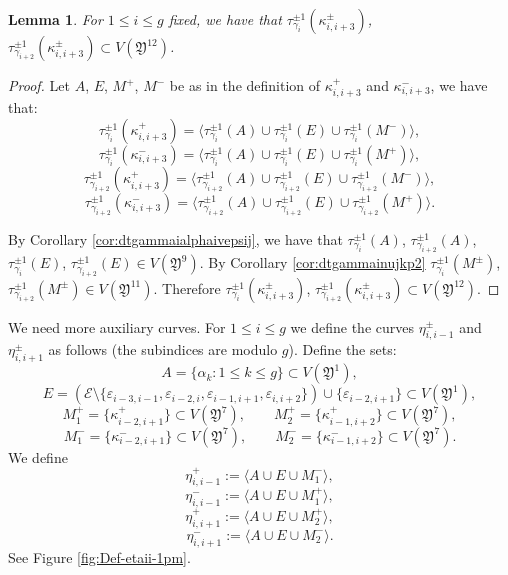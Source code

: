 \documentclass{artv3}
\newtheorem{lemma}[theorem]{Lemma}
\newcommand*{\veps}{\varepsilon}
\newcommand*{\dt}[1]{\tau_{#1}}
\newcommand{\E}{\mathcal{E}}
\newcommand*{\Y}{\mathfrak{Y}}
\begin{document}
\begin{lemma}\label{lemma:dtgammaikappaiip3}
For $1\leq i \leq g $ fixed, we have that $\dt{\gamma_{i}}^{\pm 1}(\kappa_{i,i+3}^{\pm})$, $\dt{\gamma_{i+2}}^{\pm 1}(\kappa_{i,i+3}^{\pm}) \subset V(\Y^{12})$.
\end{lemma}
\begin{proof}
Let $A$, $E$, $M^{+}$, $M^{-}$ be as in the definition of $\kappa_{i,i+3}^{+}$ and $\kappa_{i,i+3}^{-}$, we have that:
$$\dt{\gamma_{i}}^{\pm 1}(\kappa_{i,i+3}^{+}) = \langle \dt{\gamma_{i}}^{\pm 1}(A)\cup \dt{\gamma_{i}}^{\pm 1}(E) \cup \dt{\gamma_{i}}^{\pm 1}(M^{-}) \rangle, $$
$$\dt{\gamma_{i}}^{\pm 1}(\kappa_{i,i+3}^{-}) = \langle \dt{\gamma_{i}}^{\pm 1}(A)\cup \dt{\gamma_{i}}^{\pm 1}(E) \cup \dt{\gamma_{i}}^{\pm 1}(M^{+}) \rangle, $$
$$\dt{\gamma_{i+2}}^{\pm 1}(\kappa_{i,i+3}^{+}) = \langle \dt{\gamma_{i+2}}^{\pm 1}(A)\cup \dt{\gamma_{i+2}}^{\pm 1}(E) \cup \dt{\gamma_{i+2}}^{\pm 1}(M^{-}) \rangle, $$
$$\dt{\gamma_{i+2}}^{\pm 1}(\kappa_{i,i+3}^{-}) = \langle \dt{\gamma_{i+2}}^{\pm 1}(A)\cup \dt{\gamma_{i+2}}^{\pm 1}(E) \cup \dt{\gamma_{i+2}}^{\pm 1}(M^{+}) \rangle.$$

By Corollary \ref{cor:dtgammaialphaivepsij}, we have that $\dt{\gamma_{i}}^{\pm 1}(A)$, $\dt{\gamma_{i+2}}^{\pm 1}(A)$, $\dt{\gamma_{i}}^{\pm 1}(E)$, $\dt{\gamma_{i+2}}^{\pm 1}(E) \in  V(\Y^{9})$. By  Corollary \ref{cor:dtgammainujkp2} $\dt{\gamma_{i}}^{\pm 1}(M^{\pm})$, $\dt{\gamma_{i+2}}^{\pm 1}(M^{\pm})\in V(\Y ^{11})$. Therefore $\dt{\gamma_{i}}^{\pm 1}(\kappa_{i,i+3}^{\pm})$, $\dt{\gamma_{i+2}}^{\pm 1}(\kappa_{i,i+3}^{\pm}) \subset V(\Y^{12})$.
\end{proof}

We need more auxiliary curves. For $1 \leq i \leq g$ we define  the curves $\eta_{i,i-1}^{\pm}$ and $\eta_{i,i+1}^{\pm}$ as follows (the subindices are modulo $g$). Define the sets:
$$ A = \{\alpha_k : 1 \leq k \leq g\} \subset V(\Y^1),$$
$$E = (\E \setminus \{\veps_{i-3,i-1}, \veps_{i-2,i},\veps_{i-1,i+1}, \veps_{i,i+2} \}) \cup \{\veps_{i-2,i+1}\}\subset V(\Y^{1}),$$
$$M_{1}^{+} = \{\kappa_{i-2,i+1}^{+} \} \subset V(\Y^{7}), \qquad M_{2}^{+} = \{\kappa_{i-1,i+2}^{+} \} \subset V(\Y^{7}),$$
$$M_{1}^{-} = \{\kappa_{i-2,i+1}^{-} \} \subset V(\Y^{7}), \qquad M_{2}^{-} = \{\kappa_{i-1,i+2}^{-} \} \subset V(\Y^{7}).$$
We define 
$$\eta_{i,i-1}^{+}:=\langle A\cup E\cup M_{1}^{-}\rangle,$$
$$\eta_{i,i-1}^{-}:=\langle A\cup E\cup M_{1}^{+}\rangle,$$
$$\eta_{i,i+1}^{+}:=\langle A\cup E\cup M_{2}^{+}\rangle,$$
$$\eta_{i,i+1}^{-}:=\langle A\cup E\cup M_{2}^{-}\rangle.$$
See Figure \ref{fig:Def-etaii-1pm}.
\end{document}
